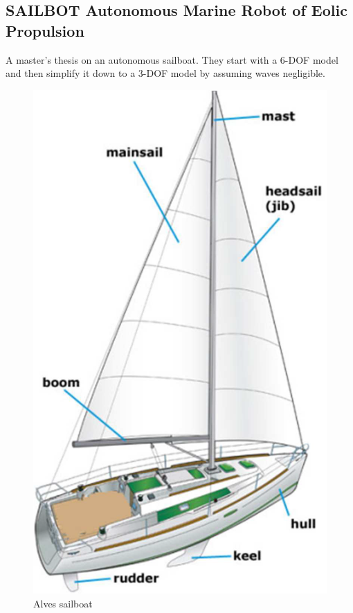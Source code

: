 \documentclass[conference]{IEEEtran}
\begin{document}
\subsection{SAILBOT Autonomous Marine Robot of Eolic Propulsion} \cite{Alves2010}  A master's thesis on an autonomous sailboat. They start with a 6-DOF model and then simplify it down to a 3-DOF model by assuming waves negligible.
\begin{figure}
    \centering
    \includegraphics{documents/figures/alves_sailboat.png}
    \caption{Alves sailboat \cite{Alves2010}}
    \label{fig:alves_sailboat}
\end{figure}
\end{document}
